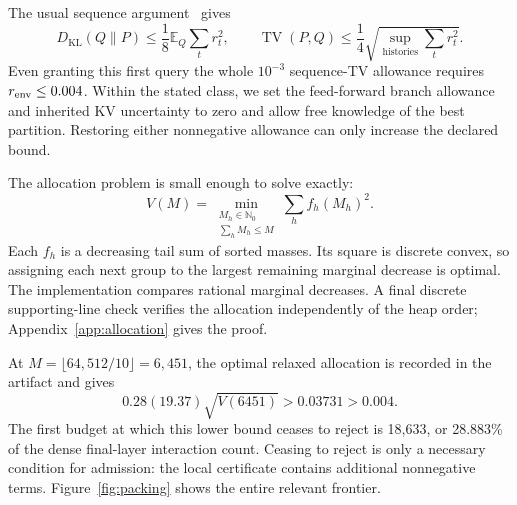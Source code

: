 \documentclass[10pt]{article}
\theoremstyle{definition}\newtheorem{definition}[theorem]{Definition}
\newcommand{\TV}{\operatorname{TV}}
\newcommand{\KL}{D_{\mathrm{KL}}}
\newcommand{\E}{\mathbb E}
\begin{document}
The usual sequence argument~\citep{hoeffding1963,cover2006} gives
\begin{equation}\label{eq:hoeffding}
 \KL(Q\|P)\leq\frac18\E_Q\sum_t r_t^2,
 \qquad
 \TV(P,Q)\leq\frac14\sqrt{\sup_{\text{histories}}\sum_t r_t^2}.
\end{equation}
Even granting this first query the whole $10^{-3}$ sequence-TV allowance requires $r_{\rm env}\leq0.004$. Within the stated class, we set the feed-forward branch allowance and inherited KV uncertainty to zero and allow free knowledge of the best partition. Restoring either nonnegative allowance can only increase the declared bound.

The allocation problem is small enough to solve exactly:
\begin{equation}\label{eq:allocation}
 V(M)=\min_{\substack{M_h\in\mathbb N_0\\\sum_h M_h\leq M}}
                         \sum_h f_h(M_h)^2.
\end{equation}
Each $f_h$ is a decreasing tail sum of sorted masses. Its square is discrete convex, so assigning each next group to the largest remaining marginal decrease is optimal. The implementation compares rational marginal decreases. A final discrete supporting-line check verifies the allocation independently of the heap order; Appendix~\ref{app:allocation} gives the proof.

At $M=\lfloor64{,}512/10\rfloor=6{,}451$, the optimal relaxed allocation is recorded in the artifact and gives
\[
 0.28(19.37)\sqrt{V(6451)}>0.03731>0.004.
\]
The first budget at which this lower bound ceases to reject is 18,633, or 28.883\% of the dense final-layer interaction count. Ceasing to reject is only a necessary condition for admission: the local certificate contains additional nonnegative terms. Figure~\ref{fig:packing} shows the entire relevant frontier.
\end{document}
